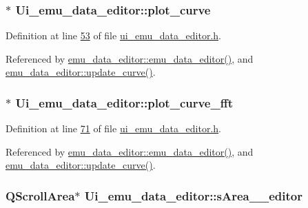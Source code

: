 \hypertarget{a00079_a1d46308dee8db7e3c99af65f13055479}{
\subsubsection[{plot\+\_\+curve}]{$\ast$ Ui\+\_\+emu\+\_\+data\+\_\+editor\+::plot\+\_\+curve}}\label{a00079_a1d46308dee8db7e3c99af65f13055479}


Definition at line \hyperlink{a00138_source_l00053}{53} of file \hyperlink{a00138_source}{ui\+\_\+emu\+\_\+data\+\_\+editor.\+h}.



Referenced by \hyperlink{a00093_source_l00012}{emu\+\_\+data\+\_\+editor\+::emu\+\_\+data\+\_\+editor()}, and \hyperlink{a00093_source_l00284}{emu\+\_\+data\+\_\+editor\+::update\+\_\+curve()}.

\hypertarget{a00079_a2bdf46ca3b702151408e6f6bd96b3228}{
\subsubsection[{plot\+\_\+curve\+\_\+fft}]{$\ast$ Ui\+\_\+emu\+\_\+data\+\_\+editor\+::plot\+\_\+curve\+\_\+fft}}\label{a00079_a2bdf46ca3b702151408e6f6bd96b3228}


Definition at line \hyperlink{a00138_source_l00071}{71} of file \hyperlink{a00138_source}{ui\+\_\+emu\+\_\+data\+\_\+editor.\+h}.



Referenced by \hyperlink{a00093_source_l00012}{emu\+\_\+data\+\_\+editor\+::emu\+\_\+data\+\_\+editor()}, and \hyperlink{a00093_source_l00284}{emu\+\_\+data\+\_\+editor\+::update\+\_\+curve()}.

\hypertarget{a00079_a6f79b6b1fe81457d76b076a543ee4089}{
\subsubsection[{s\+Area\+\_\+\+\_\+editor}]{\setlength{\rightskip}{0pt plus 5cm}Q\+Scroll\+Area$\ast$ Ui\+\_\+emu\+\_\+data\+\_\+editor\+::s\+Area\+\_\+\+\_\+editor}}\label{a00079_a6f79b6b1fe81457d76b076a543ee4089}


